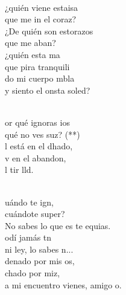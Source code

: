 \begin{cancion}[Saulo][Nico]%
	    \\
	¿quién viene estaisa \\
	que me in el coraz?\\
	¿De quién son estorazos \\
	que me aban?\\
	¿quién esta ma\\
	que pira tranquili\\
	do mi cuerpo mbla\\
	y siento el onsta soled?\\\jump\\
	\begin{chorus}%
	or qué ignoras ios\\
	qué no ves suz? (**)\\
	l está en el dhado,\\
	v en el abandon,\\
	l tir lld.\\
	\end{chorus}%
	\jump\\
	uándo te ign, \\
	cuándote super?\\
	No sabes lo que es te equias.\\
	odí jamás tn\\
	ni ley, lo sabes n...\\
\jump
	denado por mis os, \\
	chado por miz,\\
	a mi encuentro vienes,  amigo o.\\

\end{cancion}
